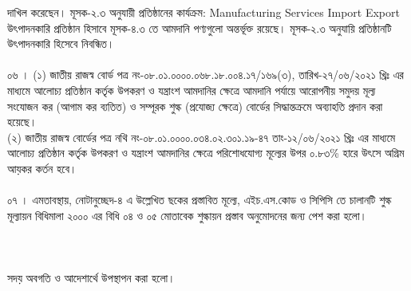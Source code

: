 \documentclass[11pt]{article}
\begin{document}
দাখিল করেছেন। মূসক-২.৩ অনুযায়ী প্রতিষ্ঠানের কার্যক্রম:
Manufacturing Services Import Export
উৎপাদনকারি প্রতিষ্ঠান হিসাবে মূসক-৪.৩ তে আমদানি পণ্যগুলো
অন্তর্ভূক্ত রয়েছে। মূসক-২.৩ অনুযায়ি প্রতিষ্ঠানটি উৎপাদনকারি হিসেবে
নিবন্ধিত।
\\
\\
০৬ । (১) জাতীয় রাজস্ব বোর্ড পত্র নং-০৮.০১.০০০০.০৬৮.১৮.০০৪.১৭/১৬৯(৩),
তারিখ-২৭/০৬/২০২১ খ্রিঃ এর মাধ্যমে আলোচ্য প্রতিষ্ঠান কর্তৃক উপকরণ ও যন্ত্রাংশ
আমদানির ক্ষেত্রে আমদানি পর্যায়ে আরোপনীয় সমুদয় মূল্য সংযোজন কর (আগাম কর ব্যতিত)
ও সম্পূরক শুল্ক (প্রযোজ্য ক্ষেত্রে) বোর্ডের সিদ্ধান্তক্রমে অব্যাহতি প্রদান করা হয়েছে।
\\
(২) জাতীয় রাজস্ব বোর্ডের পত্র নথি নং-০৮.০১.০০০০.০৩৪.০২.৩০১.১৯-৪৭
তাং-১২/০৬/২০২১ খ্রিঃ এর মাধ্যমে আলোচ্য প্রতিষ্ঠান কর্তৃক উপকরণ ও যন্ত্রাংশ
আমদানির ক্ষেত্রে পরিশোধযোগ্য মূল্যের উপর ০.৮৩\% হারে উৎসে অগ্রিম আয়কর
কর্তন হবে।
\\
\\
০৭ । এমতাবস্থায়, নোটানুচ্ছেদ-৪ এ উল্লেখিত ছকের প্রস্তাবিত মূল্যে,
এইচ.এস.কোড ও সিপিসি তে চালানটি শুল্ক মূল্যায়ন বিধিমালা ২০০০
এর বিধি ০৪ ও ০৫ মোতাবেক শুল্কায়ন প্রস্তাব অনুমোদনের জন্য পেশ
করা হলো।
\\
\\
\\
\\
সদয় অবগতি ও আদেশার্থে উপস্থাপন করা হলো।

\thispagestyle{laststyle}
\end{document}
